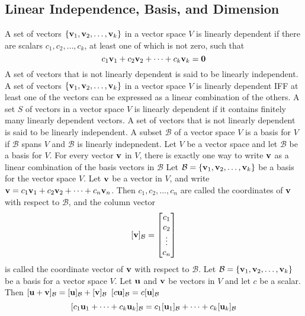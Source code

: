 \documentclass{article}
\begin{document}
        \subsection{Linear Independence, Basis, and Dimension}
        \begin{outline}
            \1 A set of vectors \(\{\vb v_1,\vb v_2,\ldots,\vb v_k\}\) in a vector space $V$ is linearly dependent if there are scalars \(c_1,c_2,\ldots,c_k\), at least one of which is not zero, such that \[c_1\vb v_1+c_2\vb v_2+\cdots+c_k\vb v_k=\vb 0\] A set of vectors that is not linearly dependent is said to be linearly independent. 
            \1 A set of vectors \(\{\vb v_1,\vb v_2,\ldots,\vb v_k\}\) in a vector space $V$ is linearly dependent IFF at least one of the vectors can be expressed as a linear combination of the others. 
            \1 A set $S$ of vectors in a vector space $V$ is linearly dependent if it contains finitely many linearly dependent vectors. A set of vectors that is not linearly dependent is said to be linearly independent. 
            \1 A subset \(\mathcal B\) of a vector space $V$ is a basis for $V$ if 
                \2 \(\mathcal B\) spans $V$ and 
                \2 \(\mathcal B\) is linearly indepnedent. 
            \1 Let $V$ be a vector space and let \(\mathcal B\) be a basis for $V$. For every vector \(\vb v\) in $V$, there is exactly one way to write $\vb v$ as a linear combination of the basis vectors in \(\mathcal B\)
            \1 Let \(\mathcal B=\{\vb v_1,\vb v_2,\ldots,\vb v_k\}\) be a basis for the vector space $V$. Let \(\vb v\) be a vector in $V$, and write \(\vb v=c_1\vb v_1+c_2\vb v_2+\cdots+c_n\vb v_n\). Then \(c_1,c_2,\ldots,c_n\) are called the coordinates of \(\vb v\) with respect to \(\mathcal B\), and the column vector \[[\vb v]_{\mathcal B}=\begin{bmatrix}
                c_1\\c_2\\\vdots\\c_n
            \end{bmatrix}\] is called the coordinate vector of \(\vb v\) with respect to \(\mathcal B\). 
            \1 Let \(\mathcal B=\{\vb v_1,\vb v_2,\ldots,\vb v_k\}\) be a basis for a vector space $V$. Let \(\vb u\) and \(\vb v\) be vectors in $V$ and let \(c\) be a scalar. Then 
                \2 \([\vb u+\vb v]_\mathcal B=[\vb u]_\mathcal B+[\vb v]_\mathcal B\)
                \2 \([c\vb u]_\mathcal B=c[\vb u]_\mathcal B\)
            \1 \[[c_1\vb u_1+\cdots+c_k\vb u_k]_\mathcal B=c_1[\vb u_1]_\mathcal B+\cdots+c_k[\vb u_k]_\mathcal B\]

\end{outline}
\end{document}
